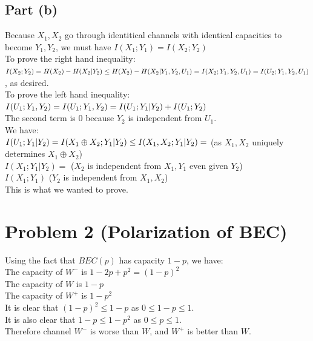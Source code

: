 \documentclass[a4paper,10pt]{article}
\begin{document}
\subsection{Part (b)}
Because $X_1, X_2$ go through identitical channels with identical capacities to become $Y_1, Y_2$, we must have $I(X_1; Y_1) = I(X_2; Y_2)$\\
To prove the right hand inequality:\\
$I(X_2; Y_2) =\\
H(X_2) - H(X_2 | Y_2) \leq\\
H(X_2) - H(X_2| Y_1, Y_2, U_1) =\\
I(X_2; Y_1, Y_2, U_1)= \\
I(U_2; Y_1, Y_2, U_1)$, as desired.\\
To prove the left hand inequality:\\
$I(U_1; Y_1, Y_2) = \\
I(U_1; Y_1, Y_2)=\\
I(U_1; Y_1 | Y_2) + I(U_1; Y_2)$\\
The second term is $0$ because $Y_2$ is independent from $U_1$.\\
We have:\\
$I(U_1; Y_1 | Y_2) = \\
I(X_1 \oplus X_2 ; Y_1|Y_2) \leq\\
I(X_1, X_2; Y_1 | Y_2)=$ \qquad (as $X_1, X_2$ uniquely determines $X_1 \oplus X_2$)\\
$I(X_1; Y_1 | Y_2) = $ \qquad ($X_2$ is independent from $X_1, Y_1$ even given $Y_2$)\\
$I(X_1; Y_1)$ \qquad ($Y_2$ is independent from $X_1, X_2$)\\
This is what we wanted to prove.
\section{Problem 2 (Polarization of BEC)}
Using the fact that $BEC(p)$ has capacity $1-p$, we have:\\
The capacity of $W^-$ is $1-2p + p^2 = (1-p)^2$\\
The capacity of $W$ is $1 - p$\\
The capacity of $W^+$ is $1 - p^2$\\
It is clear that $(1-p)^2 \leq 1 - p$ as $0 \leq 1-p \leq 1$. \\
It is also clear that $1-p \leq 1-p^2$ as $0 \leq p\leq 1$. \\
Therefore channel $W^-$ is worse than $W$, and $W^+$ is better than $W$.
\end{document}

